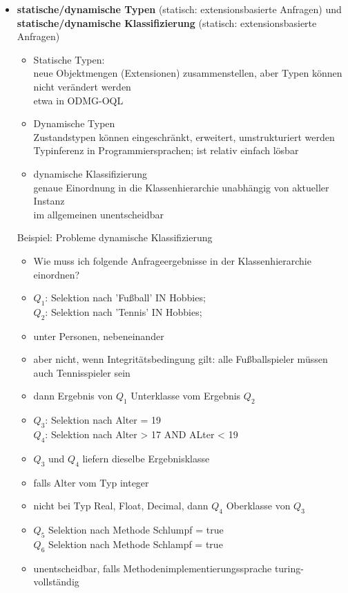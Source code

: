 \begin{itemize}
\begin{itemize}
\begin{itemize}
\begin{itemize}
			\end{itemize}
		\end{itemize} 
		\item \textbf{ statische/dynamische Typen} (statisch: extensionsbasierte Anfragen) und \\
		\textbf{statische/dynamische Klassifizierung} (statisch: extensionsbasierte Anfragen)
		\begin{itemize}
			\item Statische Typen:\\
			neue Objektmengen (Extensionen) zusammenstellen, aber Typen können nicht verändert werden\\
			etwa in ODMG-OQL
			\item Dynamische Typen\\
			Zustandstypen können eingeschränkt, erweitert, umstrukturiert werden\\
			Typinferenz in Programmiersprachen; ist relativ einfach lösbar
			\item dynamische Klassifizierung\\
			genaue Einordnung in die Klassenhierarchie unabhängig von aktueller Instanz\\
			im allgemeinen unentscheidbar
		\end{itemize}
		
		Beispiel: Probleme dynamische Klassifizierung
		\begin{itemize}
			\item Wie muss ich folgende Anfrageergebnisse in der Klassenhierarchie einordnen?
			\item $Q_1$: Selektion nach 'Fußball' IN Hobbies;\\
			$Q_2$: Selektion nach 'Tennis' IN Hobbies;
			\item unter Personen, nebeneinander
			\item aber nicht, wenn Integritätsbedingung gilt: alle Fußballspieler müssen auch Tennisspieler sein
			\item dann Ergebnis von $Q_1$ Unterklasse vom Ergebnis $Q_2$
			\item $Q_3$: Selektion nach Alter = 19\\
			$Q_4$: Selektion nach Alter > 17 AND ALter < 19
			\item $Q_3$ und $Q_4$ liefern dieselbe Ergebnisklasse
			\item falls Alter vom Typ integer
			\item nicht bei Typ Real, Float, Decimal, dann $Q_4$ Oberklasse von $Q_3$
			\item $Q_5$ Selektion nach Methode Schlumpf = true\\
			$Q_6$ Selektion nach Methode Schlampf = true
			\item unentscheidbar, falls Methodenimplementierungssprache turing-vollständig
		\end{itemize}
	\end{itemize}
	
\end{itemize}


